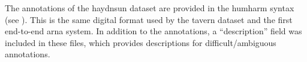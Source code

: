 
The annotations of the \gls{haydnsun} dataset are provided
in the \gls{humharm} syntax (see
). This is the same digital
format used by the \gls{tavern} dataset and the first
end-to-end \gls{arna} system. In addition to the
annotations, a ``description'' field was included in these
files, which provides descriptions for difficult/ambiguous
annotations.
